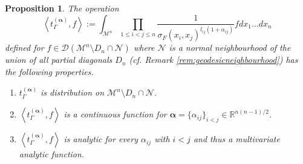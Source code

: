 \documentclass[a4paper,10pt,twoside]{article}
\numberwithin{equation}{section}
\newcounter{and}
\def\M{\mathcal{M}}
\def\N{\mathcal{N}}
\def\D{\mathcal{D}}
\def\balpha{{\boldsymbol{\alpha}}}
\theoremstyle{plain}
\newtheorem{propo}[theo]{Proposition}
\theoremstyle{definition}
\begin{document}
\begin{propo}\label{pr:prod-sigma}The operation
\begin{equation}\label{eq:prod-sigma}
\left\langle t_\Gamma^{(\balpha)}, f \right\rangle :=
\int_{\M^n}
\prod_{1\leq i < j \leq n } \frac{1}{\sigma_F(x_i,x_j)^{l_{ij}(1+ \alpha_{ij})}}    f dx_1 \dots dx_n
\end{equation}
defined for $f\in \D(\M^n\setminus D_n\cap \N)$ where $\N$ is a normal neighbourhood of the union of all partial diagonals $D_n$ (cf. Remark \ref{rem:geodesicneighbourhood}) has the following properties.
\begin{enumerate}
\item $t_\Gamma^{(\balpha)}$ is distribution on $\M^n\setminus D_n\cap \N$.
\item $\left\langle t_\Gamma^{(\balpha)}, f \right\rangle$ is a continuous function for $\balpha = \{\alpha_{ij}\}_{i<j} \in \mathbb{R}^{n(n-1)/2}$.
\item $\left\langle t_\Gamma^{(\balpha)}, f \right\rangle$ is analytic for every $\alpha_{ij}$ with $i<j$ and thus a multivariate analytic function.
\end{enumerate}
%
\end{propo}
\end{document}
